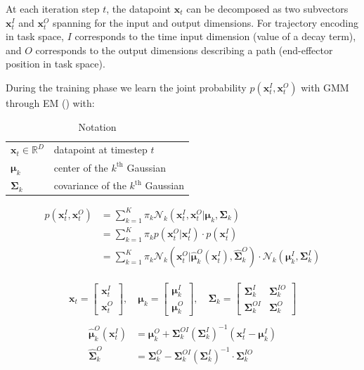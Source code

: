 \documentclass{article}
\begin{document}
At each iteration step $t$, the datapoint $\bm{x}_{t}$ can be decomposed as two subvectors $\bm{x}_{t}^{I}$ and $\bm{x}_{t}^{O}$ spanning for the input and output dimensions. For trajectory encoding in task space, $I$ corresponds to the time input dimension (\eg value of a decay term), and $O$ corresponds to the output dimensions describing a path (\eg end-effector position in task space).

During the training phase we learn the joint probability $p(\bm{x}_{t}^{I}, \bm{x}_{t}^{O})$ with GMM through EM () with:
\begin{table}[h]
  \centering
  \caption{Notation}
  \begin{tabular}{ll}
    \toprule
    $\bm{x}_{t} \in \mathbb{R}^{D}$ & datapoint at timestep $t$\\
    $\bm{\mu}_{k}$ & center of the $k^{\text{th}}$ Gaussian\\
    $\bm{\Sigma}_{k}$ & covariance of the $k^{\text{th}}$ Gaussian\\
    \bottomrule
  \end{tabular}
\end{table}

\begin{align}
  p(\bm{x}_{t}^{I}, \bm{x}_{t}^{O}) &=  \sum_{k=1}^{K}\pi_{k} \mathcal{N}_{k}(\bm{x}_{t}^{I}, \bm{x}_{t}^{O}|\bm{\mu}_{k}, \bm{\Sigma}_{k})\\
  &=  \sum_{k=1}^{K}\pi_{k} p(\bm{x}_{t}^{O}|\bm{x}_{t}^{I}) \cdot p(\bm{x}_{t}^{I})\\
  &=  \sum_{k=1}^{K}\pi_{k} \mathcal{N}_{k}(\bm{x}_{t}^{O}|\hat{\bm{\mu}}_{k}^{O}(\bm{x}_{t}^{I}), \hat{\bm{\Sigma}}_{k}^{O}) \cdot \mathcal{N}_{k}(\bm{\mu}_{k}^{I}, \bm{\Sigma}_{k}^{I})
\end{align}

\begin{gather}
  \bm{x}_{t} =
  \begin{bmatrix}
    \bm{x}_{t}^{I} \\[0.5em]
    \bm{x}_{t}^{O}
  \end{bmatrix}, \quad
  \bm{\mu}_{k} =
  \begin{bmatrix}
    \bm{\mu}_{k}^{I} \\[0.5em]
    \bm{\mu}_{k}^{O}
  \end{bmatrix}, \quad
  \bm{\Sigma}_{k} =
  \begin{bmatrix}
    \bm{\Sigma}_{k}^{I} & \bm{\Sigma}_{k}^{IO}\\[0.5em]
    \bm{\Sigma}_{k}^{OI} & \bm{\Sigma}_{k}^{O}
  \end{bmatrix}\\
\end{gather}
\begin{align}
  \hat{\bm{\mu}}_{k}^{O}(\bm{x}_{t}^{I}) &= \bm{\mu}_{k}^{O} + \bm{\Sigma}_{k}^{OI}  (\bm{\Sigma}_{k}^{I})^{-1}  (\bm{x}_{t}^{I} - \bm{\mu}_{k}^{I})\\
  \hat{\bm{\Sigma}}_{k}^{O} &= \bm{\Sigma}_{k}^{O} - \bm{\Sigma}_{k}^{OI}  (\bm{\Sigma}_{k}^{I})^{-1} \cdot \bm{\Sigma}_{k}^{IO}
\end{align}
\end{document}
